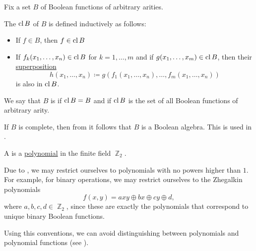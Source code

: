 \begin{definition}\label{def:boolean_closure}
  Fix a set \( B \) of Boolean functions of arbitrary arities.

  The  \( \operatorname{cl}{B} \) of \( B \) is defined inductively as follows:
  \begin{itemize}
    \item If \( f \in B \), then \( f \in \operatorname{cl}{B} \)
    \item If \( f_k(x_1, \ldots, x_n) \in \operatorname{cl}{B} \) for \( k = 1, \ldots, m \) and if \( g(x_1, \ldots, x_m) \in \operatorname{cl}{B} \), then their \hyperref[def:multi_valued_function/superposition]{superposition}
    \begin{equation*}
      h(x_1, \ldots, x_n) \coloneqq g(f_1(x_1, \ldots, x_n), \ldots, f_m(x_1, \ldots, x_n))
    \end{equation*}
    is also in \( \operatorname{cl}{B} \).
  \end{itemize}

  We say that \( B \) is  if \( \operatorname{cl}{B} = B \) and  if \( \operatorname{cl}{B} \) is the set of all Boolean functions of arbitrary arity.

  If \( B \) is complete, then from  it follows that \( B \) is a Boolean algebra. This is used in .
\end{definition}

\begin{definition}\label{def:zhegalkin_polynomial}
  A  is a \hyperref[def:polynomial_semiring]{polynomial} in the finite field \hyperref[thm:f2_is_boolean_algebra]{\( \BbbZ_2 \)}.

  Due to , we may restrict ourselves to polynomials with no powers higher than \( 1 \). For example, for binary operations, we may restrict ourselves to the Zhegalkin polynomials
  \begin{equation}\label{eq:def:zhegalkin_polynomial/binary_polynomial}
    f(x, y) = axy \oplus bx \oplus cy \oplus d,
  \end{equation}
  where \( a, b, c, d \in \BbbZ_2 \), since these are exactly the polynomials that correspond to unique binary Boolean functions.

  Using this conventions, we can avoid distinguishing between polynomials and polynomial functions (see ).
\end{definition}

